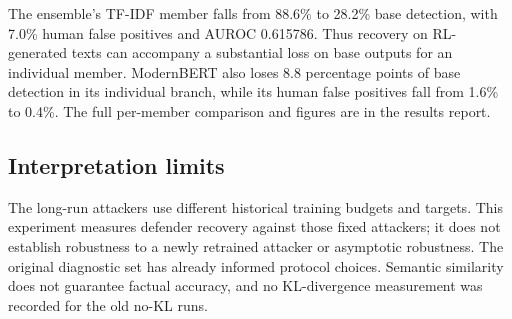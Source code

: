 The ensemble's TF-IDF member falls from 88.6\% to 28.2\% base detection,
with 7.0\% human false positives and AUROC 0.615786. Thus recovery on
RL-generated texts can accompany a substantial loss on base outputs for
an individual member. ModernBERT also loses 8.8 percentage points of
base detection in its individual branch, while its human false positives
fall from 1.6\% to 0.4\%. The full per-member comparison and figures are
in the results report.

\subsection{Interpretation
limits}\label{record-docs-defender-comparison-md-interpretation-limits}

The long-run attackers use different historical training budgets and
targets. This experiment measures defender recovery against those fixed
attackers; it does not establish robustness to a newly retrained
attacker or asymptotic robustness. The original diagnostic set has
already informed protocol choices. Semantic similarity does not
guarantee factual accuracy, and no KL-divergence measurement was
recorded for the old no-KL runs.
